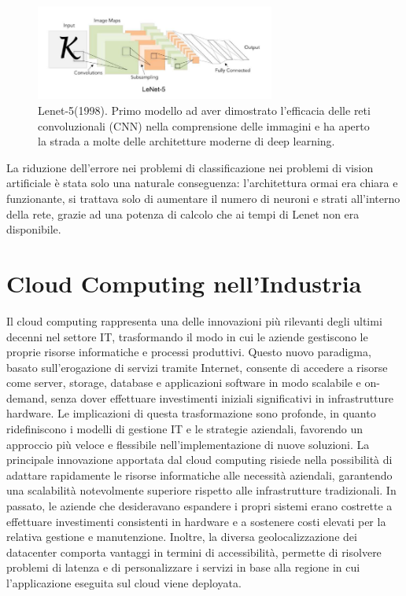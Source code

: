 \begin{figure}[htbp]
    \centering
    \includegraphics[width=0.7\textwidth]{figures/Lenet.png}
    \caption{Lenet-5(1998). Primo modello ad aver dimostrato l'efficacia delle reti convoluzionali (CNN) nella comprensione delle immagini e ha aperto la strada a molte delle architetture moderne di deep learning.}
    \label{fig:Lenet-5}
\end{figure}

\noindent La riduzione dell'errore nei problemi di classificazione nei problemi di vision artificiale è stata solo una naturale conseguenza: l'architettura ormai era chiara e funzionante, si trattava solo di aumentare il numero di neuroni e strati all'interno della rete, grazie ad una potenza di calcolo che ai tempi di Lenet non era disponibile.  
   

\section{Cloud Computing nell'Industria}

Il cloud computing rappresenta una delle innovazioni più rilevanti degli ultimi decenni nel settore IT, trasformando il modo in cui le aziende gestiscono le proprie risorse informatiche e processi produttivi. Questo nuovo paradigma, basato sull’erogazione di servizi tramite Internet, consente di accedere a risorse come server, storage, database e applicazioni software in modo scalabile e on-demand, senza dover effettuare investimenti iniziali significativi in infrastrutture hardware. Le implicazioni di questa trasformazione sono profonde, in quanto ridefiniscono i modelli di gestione IT e le strategie aziendali, favorendo un approccio più veloce e flessibile nell’implementazione di nuove soluzioni. La principale innovazione apportata dal cloud computing risiede nella possibilità di adattare rapidamente le risorse informatiche alle necessità aziendali, garantendo una scalabilità notevolmente superiore rispetto alle infrastrutture tradizionali. In passato, le aziende che desideravano espandere i propri sistemi erano costrette a effettuare investimenti consistenti in hardware e a sostenere costi elevati per la relativa gestione e manutenzione. Inoltre, la diversa geolocalizzazione dei datacenter comporta vantaggi in termini di accessibilità, permette di risolvere problemi di latenza e di personalizzare i servizi in base alla regione in cui l'applicazione eseguita sul cloud viene deployata. 


